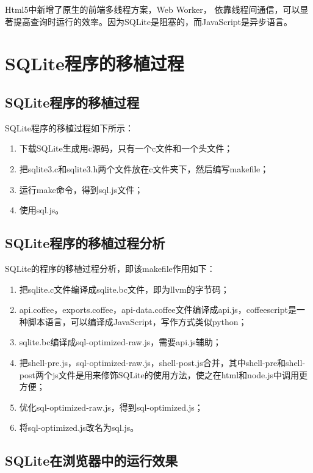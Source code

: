 Html5中新增了原生的前端多线程方案，Web Worker，
依靠线程间通信，可以显著提高查询时运行的效率。因为SQLite是阻塞的，而JavaScript是异步语言。

\section{SQLite程序的移植过程}

\subsection{SQLite程序的移植过程}

SQLite程序的移植过程如下所示：

\begin{enumerate}[itemindent=2em]
    \item 下载SQLite生成用c源码，只有一个c文件和一个头文件；
    \item 把sqlite3.c和sqlite3.h两个文件放在c文件夹下，然后编写makefile；  	
	\item 运行make命令，得到sql.js文件；
	\item 使用sql.js。
\end{enumerate}

\subsection{SQLite程序的移植过程分析}

SQLite的程序的移植过程分析，即该makefile作用如下：

\begin{enumerate}[itemindent=2em]
    \item 把sqlite.c文件编译成sqlite.bc文件，即为llvm的字节码；
    \item api.coffee，exports.coffee，api-data.coffee文件编译成api.js，coffeescript是一种脚本语言，可以编译成JavaScript，写作方式类似python；
    \item sqlite.bc编译成sql-optimized-raw.js，需要api.js辅助；
	\item 把shell-pre.js，sql-optimized-raw.js，shell-post.js合并，其中shell-pre和shell-post两个js文件是用来修饰SQLite的使用方法，使之在html和node.js中调用更方便；
	\item 优化sql-optimized-raw.js，得到sql-optimized.js；
	\item 将sql-optimized.js改名为sql.js。
\end{enumerate}

\subsection{SQLite在浏览器中的运行效果}

